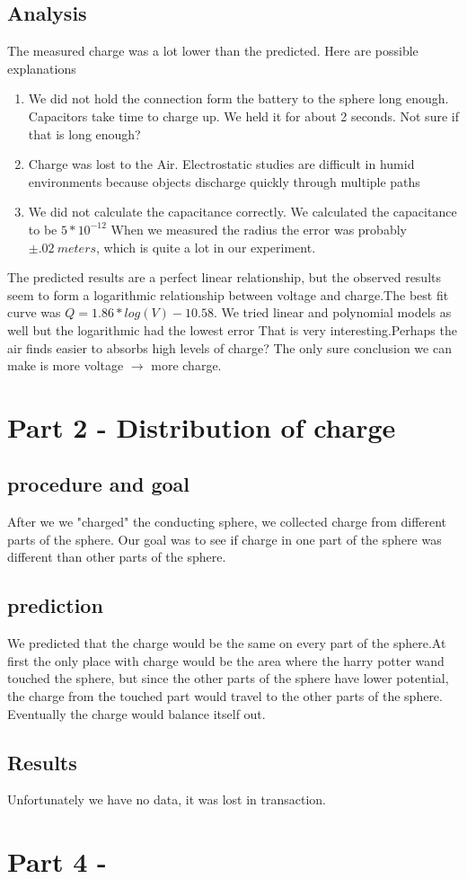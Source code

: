 \documentclass[12pt]{article}
\begin{document}
\subsection*{Analysis}
The measured charge was a lot lower than the predicted. Here are possible explanations
\begin{enumerate}
	\item 
	We did not hold the connection form the battery to the sphere long enough. Capacitors take time to charge up. We held it for about 2 seconds. Not sure if that is long enough?
	\item Charge was lost to the Air. Electrostatic studies are difficult in humid environments because objects discharge quickly through multiple paths 
	\item We did not calculate the capacitance correctly. We calculated the capacitance to be $5 * 10^{-12}$ When we measured the radius the error was probably $\pm .02 \ meters$, which is quite a lot in our experiment.
\end{enumerate}
The predicted results are a perfect linear relationship, but the observed results seem to form a logarithmic relationship between voltage and charge.The best fit curve was $Q=1.86*log(V)-10.58$. We tried linear and polynomial models as well but the logarithmic had the lowest error That is very interesting.Perhaps the air finds easier to absorbs high levels of charge? The only sure conclusion we can make is more voltage $\rightarrow$ more charge.

\section*{Part 2 - Distribution of charge}
\subsection*{procedure and goal}
After we we "charged" the conducting sphere, we collected charge from different parts of the sphere. Our goal was to see if charge in one part of the sphere was different than other parts of the sphere.
\subsection*{prediction}
We predicted that the charge would be the same on every part of the sphere.At first the only place with charge would be the area where the harry potter wand touched the sphere, but since the other parts of the sphere have lower potential, the charge from the touched part would travel to the other parts of the sphere. Eventually the charge would balance itself out. 
\subsection*{Results} 
Unfortunately we have no data, it was lost in transaction.   

\section*{Part 4 - }
\end{document}
